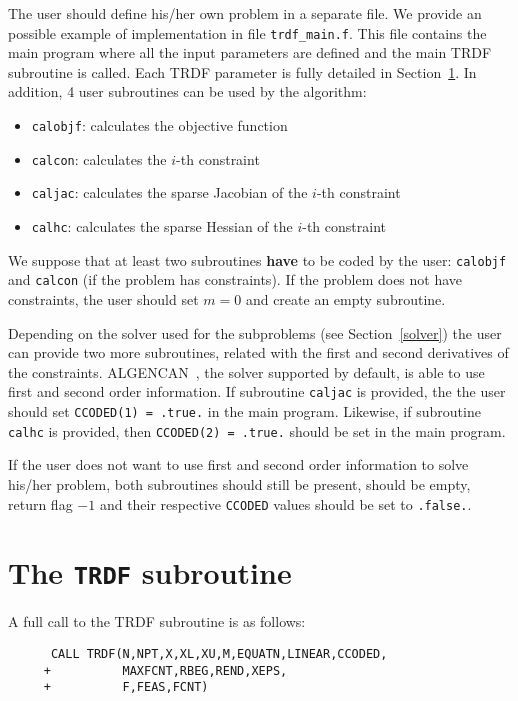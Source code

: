 \documentclass[12pt]{article}
\begin{document}
The user should define his/her own problem in a separate file. We
provide an possible example of implementation in file
\texttt{trdf\_main.f}. This file contains the main program where all
the input parameters are defined and the main TRDF subroutine is
called. Each TRDF parameter is fully detailed in
Section~\ref{trdf}. In addition, 4 user subroutines can be used by the
algorithm:
\begin{itemize}
\item \texttt{calobjf}: calculates the objective function
\item \texttt{calcon}: calculates the $i$-th constraint
\item \texttt{caljac}: calculates the sparse Jacobian of the $i$-th
  constraint
\item \texttt{calhc}: calculates the sparse Hessian of the $i$-th
  constraint
\end{itemize}

We suppose that at least two subroutines \textbf{have} to be coded by
the user: \texttt{calobjf} and \texttt{calcon} (if the problem has
constraints). If the problem does not have constraints, the user
should set $m = 0$ and create an empty subroutine.

Depending on the solver used for the subproblems (see
Section~\ref{solver}) the user can provide two more subroutines,
related with the first and second derivatives of the
constraints. ALGENCAN~\cite{tango}, the solver supported by default,
is able to use first and second order information. If subroutine
\texttt{caljac} is provided, the the user should set \texttt{CCODED(1)
  = .true.} in the main program. Likewise, if subroutine
\texttt{calhc} is provided, then \texttt{CCODED(2) = .true.} should be
set in the main program.

If the user does not want to use first and second order information to
solve his/her problem, both subroutines should still be present,
should be empty, return flag $-1$ and their respective \texttt{CCODED}
values should be set to \texttt{.false.}.

\section{The \texttt{TRDF} subroutine}
\label{trdf}

A full call to the TRDF subroutine is as follows:

\begin{verbatim}
      CALL TRDF(N,NPT,X,XL,XU,M,EQUATN,LINEAR,CCODED,
     +          MAXFCNT,RBEG,REND,XEPS,
     +          F,FEAS,FCNT)     
\end{verbatim}
\end{document}
